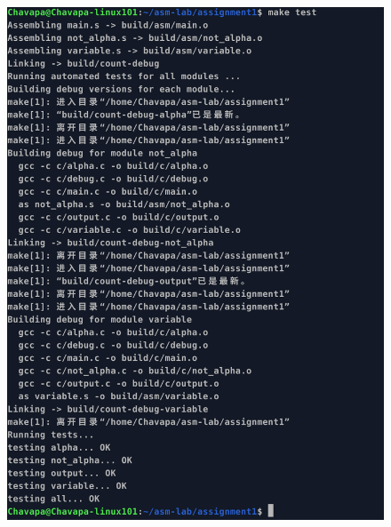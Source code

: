 \documentclass[10pt,a4paper]{article}
\begin{document}
\begin{figure}[H]
	
	\begin{minipage}{0.49\linewidth}%
		\vspace{3pt}
		\centerline{\includegraphics[width=\textwidth]{images/terminal_test.png}}
	\end{minipage}
	\begin{minipage}{0.49\linewidth}
		\vspace{3pt}

\end{minipage}
\end{figure}
\end{document}
